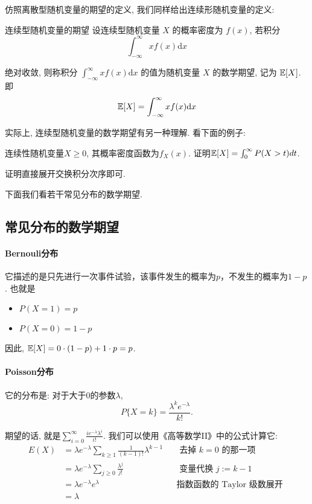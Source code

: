     
    仿照离散型随机变量的期望的定义, 我们同样给出连续形随机变量的定义:
    \begin{definition}{连续型随机变量的期望}
        设连续型随机变量 $X$ 的概率密度为 $f(x)$, 若积分
$$
\int_{-\infty}^{\infty} x f(x) \mathrm{d} x
$$

绝对收敛, 则称积分 $\int_{-\infty}^{\infty} x f(x) \mathrm{d} x$ 的值为随机变量 $X$ 的数学期望, 记为 $\mathbb E[X]$.即
$$
\mathbb E[X]=\int_{-\infty}^{\infty} x f(x) \mathrm{d} x
$$
    \end{definition}

    实际上, 连续型随机变量的数学期望有另一种理解. 看下面的例子: 
    \begin{example}
        \label{eg:expectation-calc}
        连续性随机变量$X\geq 0$, 其概率密度函数为$f_X(x)$. 证明$\mathbb E[X]=\int_0^\infty P(X>t) dt$. 
    \end{example}

    证明直接展开交换积分次序即可. 
    
    下面我们看若干常见分布的数学期望. 

    \subsection{常见分布的数学期望}

    \paragraph{Bernouli分布} 它描述的是只先进行一次事件试验，该事件发生的概率为$p$，不发生的概率为$1-p$. 也就是
    \begin{itemize}
        \item $P(X=1)=p$
        \item $P(X=0)=1-p$
    \end{itemize}

    因此, $ \mathbb E[X]=0 \cdot(1-p)+1 \cdot p=p$.

    \paragraph{Poisson分布} 它的分布是: 对于大于0的参数$\lambda$, $$
    P\{X=k\}=\frac{\lambda^k e^{-\lambda}}{k !}. 
    $$    

    期望的话, 就是$\sum_{i=0}^{\infty} \frac{i e^{-\lambda} \lambda^i}{i !}$. 我们可以使用《高等数学II》中的公式计算它: 
    $$
\begin{aligned}
{E}(X) & =\lambda e^{-\lambda} \sum_{k \geq 1} \frac{1}{(k-1) !} \lambda^{k-1} & & \text { 去掉 } k=0 \text { 的那一项 } \\
& =\lambda e^{-\lambda} \sum_{j \geq 0} \frac{\lambda^j}{j !} & & \text { 变量代换 } j:=k-1 \\
& =\lambda e^{-\lambda} e^\lambda & & \text {指数函数的 Taylor 级数展开 } \\
& =\lambda & &
\end{aligned}
$$

